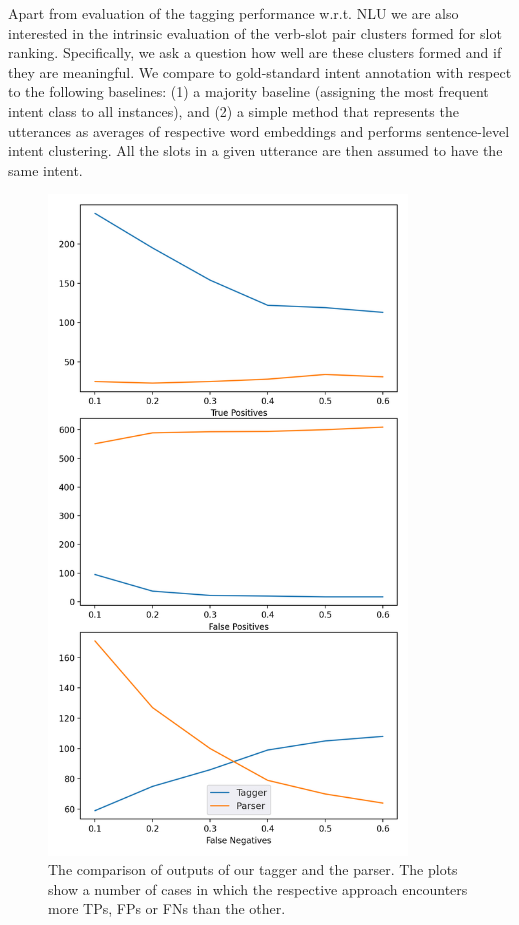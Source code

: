 Apart from evaluation of the tagging performance w.r.t. NLU we are also interested in the intrinsic evaluation of the verb-slot pair clusters formed for slot ranking.
Specifically, we ask a question how well are these clusters formed and if they are meaningful.
We compare to gold-standard intent annotation with respect to the following baselines: (1) a majority baseline (assigning the most frequent intent class to all instances), and (2) a simple method that represents the utterances as averages of respective word embeddings and performs sentence-level intent clustering.
All the slots in a given utterance are then assumed to have the same intent.

\begin{figure}
    \centering
    \includegraphics[width=0.85\textwidth]{images/slots.png}
    \caption{The comparison of outputs of our tagger and the parser. The plots show a number of cases in which the respective approach encounters more TPs, FPs or FNs than the other.}
    \label{fig:tagger_comp}
\end{figure}
